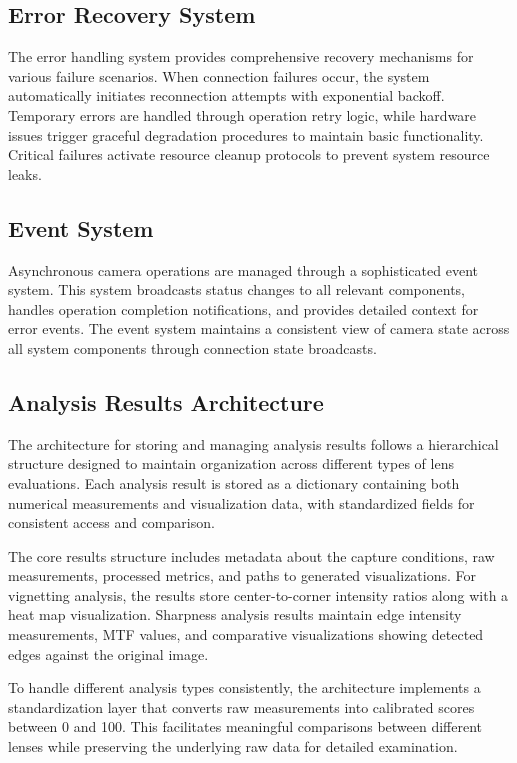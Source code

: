 \subsection{Error Recovery System}
The error handling system provides comprehensive recovery mechanisms for various failure scenarios. When connection failures occur, the system automatically initiates reconnection attempts with exponential backoff. Temporary errors are handled through operation retry logic, while hardware issues trigger graceful degradation procedures to maintain basic functionality. Critical failures activate resource cleanup protocols to prevent system resource leaks.

\subsection{Event System}
Asynchronous camera operations are managed through a sophisticated event system. This system broadcasts status changes to all relevant components, handles operation completion notifications, and provides detailed context for error events. The event system maintains a consistent view of camera state across all system components through connection state broadcasts.

\subsection{Analysis Results Architecture}
The architecture for storing and managing analysis results follows a hierarchical structure designed to maintain organization across different types of lens evaluations. Each analysis result is stored as a dictionary containing both numerical measurements and visualization data, with standardized fields for consistent access and comparison.

The core results structure includes metadata about the capture conditions, raw measurements, processed metrics, and paths to generated visualizations. For vignetting analysis, the results store center-to-corner intensity ratios along with a heat map visualization. Sharpness analysis results maintain edge intensity measurements, MTF values, and comparative visualizations showing detected edges against the original image.

To handle different analysis types consistently, the architecture implements a standardization layer that converts raw measurements into calibrated scores between 0 and 100. This facilitates meaningful comparisons between different lenses while preserving the underlying raw data for detailed examination.

